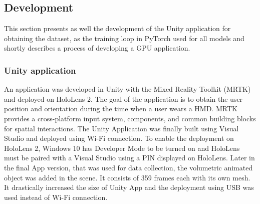 
\subsection{Development}
\label{sec:impl:model:dev}
This section presents as well the development of the Unity application for obtaining the dataset, as the training loop in PyTorch used for all models and shortly describes a process of developing a GPU application. 

\subsubsection{Unity application}
\label{sec:impl:model:dev:unity}
An application was developed in Unity with the Mixed Reality Toolkit (MRTK) and deployed on HoloLens 2. The goal of the application is to obtain the user position and orientation during the time when a user wears a HMD. MRTK provides a cross-platform input system, components, and common building blocks for spatial interactions. The Unity Application was finally built using Visual Studio and deployed using Wi-Fi connection. To enable the deployment on HoloLens 2, Windows 10 has Developer Mode to be turned on and HoloLens must be paired with a Visual Studio using a PIN displayed on HoloLens. Later in the final App version, that was used for data collection, the volumetric animated object was added in the scene. It consists of 359 frames each with its own mesh. It drastically increased the size of Unity App and the deployment using USB was used instead of Wi-Fi connection.

